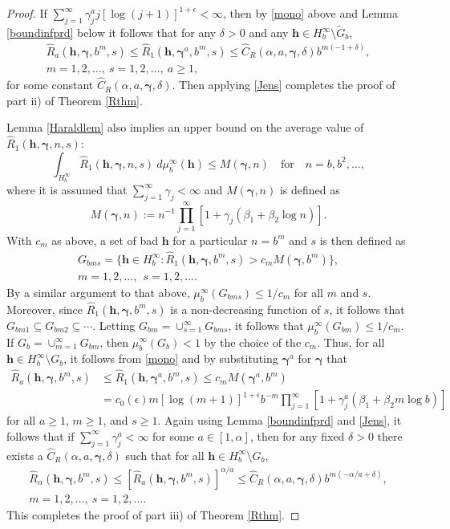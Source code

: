 \documentclass{article}
\renewcommand{\vec}[1]{\ensuremath{\mathbf{#1}}}
\newcommand{\vecsym}[1]{\ensuremath{\boldsymbol{#1}}}
\newcommand{\bfgam}{\vecsym \gamma}
\newcommand{\h}{\vec h}
\begin{document}
\begin{proof}
If $\sum_{j=1}^{\infty} \gamma_{j}^{a} j [\log(j+1)]^{1+\epsilon} < \infty$, then by
\eqref{mono} above and Lemma \ref{boundinfprd} below it follows that for any
$\delta>0$ and any $\h \in H_{b}^{\infty} \setminus \tilde{G}_{b}$,
\begin{multline*}
   \hat{R}_{a}(\h,\bfgam,b^m,s) \le \hat{R}_{1}(\h,\bfgam^{a},b^m,s) \le
   \hat{C}_{R}(\alpha,a,\bfgam,\delta) b^{m(-1+\delta)}, \\
   m=1,2,\ldots,\ s=1,2,\ldots, \ a \ge 1,
\end{multline*}
for some constant $\hat{C}_{R}(\alpha,a,\bfgam,\delta)$.  Then
applying \eqref{Jens} completes the proof of part ii) of Theorem
\ref{Rthm}.

Lemma \ref{Haraldlem} also implies an upper bound on the
average value of $\hat{R}_{1}(\h,\bfgam,n,s)$:
$$
\int_{H_{b}^{\infty}} \hat{R}_{1}(\h,\bfgam,n,s) \ d\mu_{b}^{\infty}(\h)
\le M(\bfgam,n) \quad \text{for} \quad n=b, 
b^{2}, \ldots,
$$
where it is assumed that $\sum_{j=1}^{\infty} \gamma_{j} < \infty$ and
$M(\bfgam,n)$ is defined as
$$
M(\bfgam,n) := n^{-1} \prod_{j=1}^{\infty}[1+\gamma_{j} (\beta_{1} +
\beta_{2} \log n)].
$$
With $c_m$ as above, a set of bad $\h$ for a particular $n=b^{m}$ and $s$
is then defined as
\begin{multline*}
G_{bms} = \{ \h \in H_{b}^{\infty} : \hat{R}_{1}(\h,\bfgam,b^{m},s) >
c_{m} M(\bfgam,b^{m})\},\\
m=1, 2, \ldots, \ \ s=1, 2, \ldots .
\end{multline*}
By a similar argument to that above, $\mu_{b}^{\infty}(G_{bms}) \le
1/c_{m}$ for all $m$ and $s$.  Moreover, since
$\hat{R}_{1}(\h,\bfgam,b^{m},s)$ is a non-decreasing function of $s$,
it follows that $G_{bm1} \subseteq G_{bm2} \subseteq \cdots$.  Letting
$G_{bm} = \cup_{s=1}^{\infty} G_{bms}$, it follows that
$\mu_{b}^{\infty}(G_{bm}) \le 1/c_{m}$.  If $G_{b} =
\cup_{m=1}^{\infty} G_{bm}$, then $\mu_{b}^{\infty}(G_{b}) <
1$ by the choice of the $c_m$.  Thus, for all $\h \in H_{b}^{\infty} \setminus G_{b}$, it follows from
\eqref{mono} and by substituting $\bfgam^{a}$ for $\bfgam$ that
\begin{align*}
   \hat{R}_{a}(\h,\bfgam,b^m,s) & \le 
   \hat{R}_{1}(\h,\bfgam^{a},b^m,s) \le c_{m} M(\bfgam^{a},b^{m}) \\
   &= c_{0}(\epsilon) m
   [\log(m+1)]^{1+\epsilon} b^{-m} \prod_{j=1}^{\infty} [1 +
   \gamma_{j}^{a} (\beta_{1} + \beta_{2} m \log b ) ]
\end{align*}
for all $a \ge1$, $m \ge 1$, and $s \ge 1$.  Again using Lemma \ref{boundinfprd} and
\eqref{Jens}, it follows that if $\sum_{j=1}^{\infty} \gamma_{j}^{a} <
\infty$ for some $a \in [1,\alpha]$, then for any fixed $\delta>0$
there exists a $\hat{C}_{R}(\alpha,a,\bfgam,\delta)$ such that for
all $\h \in H_{b}^{\infty} \setminus G_{b}$,
\begin{multline*}
   \hat{R}_{\alpha}(\h,\bfgam,b^m,s) \le 
   [\hat{R}_{a}(\h,\bfgam,b^m,s)]^{\alpha/a} \le
   \hat{C}_{R}(\alpha,a,\bfgam,\delta) b^{m(-\alpha/a+\delta)}, \\
   m=1,2,\ldots,\ s=1,2,\ldots.
\end{multline*}
This completes the proof of part iii) of Theorem \ref{Rthm}.
\end{proof}
\end{document}
